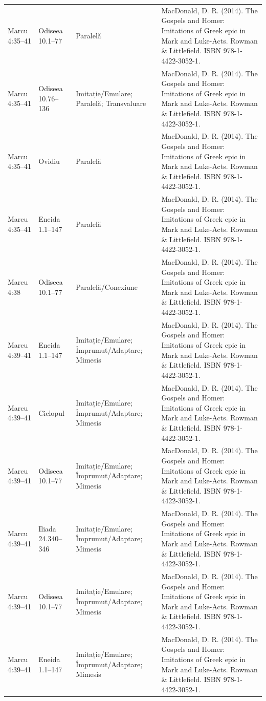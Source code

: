 \documentclass[12pt,a4paper,twoside,openany]{book}
\begin{document}
\begin{longtable}{L{1.4cm}L{1.7cm}L{3.1cm}L{8.4cm}}
Marcu 4:35–41 & Odiseea 10.1–77 & Paralelă & MacDonald, D. R. (2014). The Gospels and Homer: Imitations of Greek epic in Mark and Luke-Acts. Rowman \& Littlefield. ISBN 978-1-4422-3052-1. \\
Marcu 4:35–41 & Odiseea 10.76–136 & Imitație/Emulare; Paralelă; Transvaluare & MacDonald, D. R. (2014). The Gospels and Homer: Imitations of Greek epic in Mark and Luke-Acts. Rowman \& Littlefield. ISBN 978-1-4422-3052-1. \\
Marcu 4:35–41 & Ovidiu & Paralelă & MacDonald, D. R. (2014). The Gospels and Homer: Imitations of Greek epic in Mark and Luke-Acts. Rowman \& Littlefield. ISBN 978-1-4422-3052-1. \\
Marcu 4:35–41 & Eneida 1.1–147 & Paralelă & MacDonald, D. R. (2014). The Gospels and Homer: Imitations of Greek epic in Mark and Luke-Acts. Rowman \& Littlefield. ISBN 978-1-4422-3052-1. \\
Marcu 4:38 & Odiseea 10.1–77 & Paralelă/Conexiune & MacDonald, D. R. (2014). The Gospels and Homer: Imitations of Greek epic in Mark and Luke-Acts. Rowman \& Littlefield. ISBN 978-1-4422-3052-1. \\
Marcu 4:39–41 & Eneida 1.1–147 & Imitație/Emulare; Împrumut/Adaptare; Mimesis & MacDonald, D. R. (2014). The Gospels and Homer: Imitations of Greek epic in Mark and Luke-Acts. Rowman \& Littlefield. ISBN 978-1-4422-3052-1. \\
Marcu 4:39–41 & Ciclopul & Imitație/Emulare; Împrumut/Adaptare; Mimesis & MacDonald, D. R. (2014). The Gospels and Homer: Imitations of Greek epic in Mark and Luke-Acts. Rowman \& Littlefield. ISBN 978-1-4422-3052-1. \\
Marcu 4:39–41 & Odiseea 10.1–77 & Imitație/Emulare; Împrumut/Adaptare; Mimesis & MacDonald, D. R. (2014). The Gospels and Homer: Imitations of Greek epic in Mark and Luke-Acts. Rowman \& Littlefield. ISBN 978-1-4422-3052-1. \\
Marcu 4:39–41 & Iliada 24.340–346 & Imitație/Emulare; Împrumut/Adaptare; Mimesis & MacDonald, D. R. (2014). The Gospels and Homer: Imitations of Greek epic in Mark and Luke-Acts. Rowman \& Littlefield. ISBN 978-1-4422-3052-1. \\
Marcu 4:39–41 & Odiseea 10.1–77 & Imitație/Emulare; Împrumut/Adaptare; Mimesis & MacDonald, D. R. (2014). The Gospels and Homer: Imitations of Greek epic in Mark and Luke-Acts. Rowman \& Littlefield. ISBN 978-1-4422-3052-1. \\
Marcu 4:39–41 & Eneida 1.1–147 & Imitație/Emulare; Împrumut/Adaptare; Mimesis & MacDonald, D. R. (2014). The Gospels and Homer: Imitations of Greek epic in Mark and Luke-Acts. Rowman \& Littlefield. ISBN 978-1-4422-3052-1. \\

\end{longtable}
\end{document}
